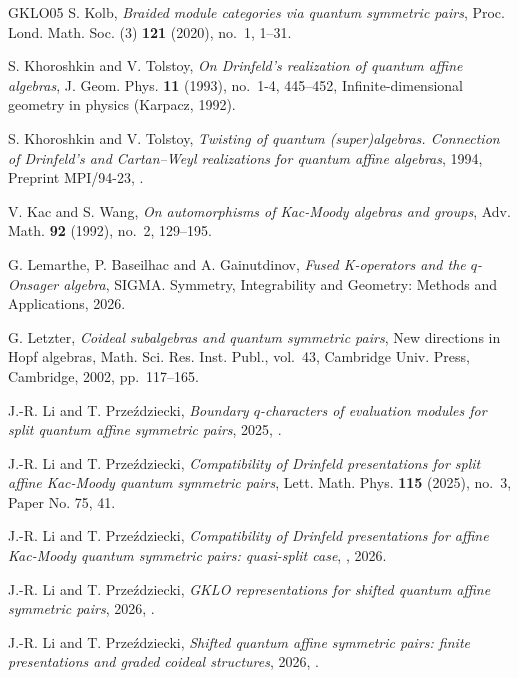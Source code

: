 \documentclass[reqno]{amsart}
\numberwithin{equation}{section}
\begin{document}
\begin{thebibliography}{GKLO05}
S. Kolb, \emph{Braided module categories via quantum symmetric pairs}, Proc.
Lond. Math. Soc. (3) \textbf{121} (2020), no.~1, 1--31. 

S. Khoroshkin and V. Tolstoy, \emph{On {D}rinfeld's realization of
	quantum affine algebras}, J. Geom. Phys. \textbf{11} (1993), no.~1-4,
445--452, Infinite-dimensional geometry in physics (Karpacz, 1992).

S. Khoroshkin and V. Tolstoy, \emph{Twisting of quantum (super)algebras. {C}onnection 
of {D}rinfeld's and {C}artan--{W}eyl realizations for quantum affine algebras},
1994, Preprint MPI/94-23, .

V. Kac and S. Wang, \emph{On automorphisms of {K}ac-{M}oody algebras and
	groups}, Adv. Math. \textbf{92} (1992), no.~2, 129--195. 

G. Lemarthe, P. Baseilhac and A. Gainutdinov,
\emph{Fused K-operators and the $q$-Onsager algebra}, 
SIGMA. Symmetry, Integrability and Geometry: Methods and Applications, 2026.

G. Letzter, \emph{Coideal subalgebras and quantum symmetric pairs}, New
directions in {H}opf algebras, Math. Sci. Res. Inst. Publ., vol.~43,
Cambridge Univ. Press, Cambridge, 2002, pp.~117--165. 

J.-R. Li and T. Prze\'{z}dziecki, \emph{Boundary $q$-characters of
	evaluation modules for split quantum affine symmetric pairs}, 2025,
.

J.-R. Li and T. Prze\'zdziecki, \emph{Compatibility of {D}rinfeld
	presentations for split affine {K}ac-{M}oody quantum symmetric pairs}, Lett.
Math. Phys. \textbf{115} (2025), no.~3, Paper No. 75, 41. 

J.-R. Li and T. Prze\'{z}dziecki, \emph{Compatibility of {D}rinfeld presentations for affine
	{K}ac-{M}oody quantum symmetric pairs: quasi-split case}, , 2026.

J.-R. Li and T. Prze\'{z}dziecki, \emph{{GKLO} representations for
	shifted quantum affine symmetric pairs}, 2026, .

J.-R. Li and T. Prze\'{z}dziecki, \emph{Shifted quantum affine symmetric pairs: finite presentations and
	graded coideal structures}, 2026, .


\end{thebibliography}
\end{document}

